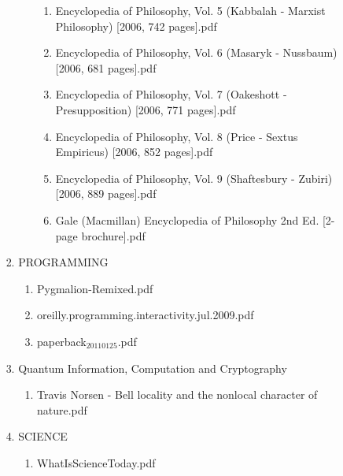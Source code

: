 \documentclass[11pt]{article}
\begin{document}
\begin{enumerate}
\begin{enumerate}
\begin{enumerate}
\begin{enumerate}
\begin{enumerate}
\begin{enumerate}
\item Encyclopedia of Philosophy, Vol. 5 (Kabbalah - Marxist Philosophy) [2006, 742 pages].pdf
\label{sec-1-1-1-1-7-3-39-16-7}

\item Encyclopedia of Philosophy, Vol. 6 (Masaryk - Nussbaum) [2006, 681 pages].pdf
\label{sec-1-1-1-1-7-3-39-16-8}

\item Encyclopedia of Philosophy, Vol. 7 (Oakeshott - Presupposition) [2006, 771 pages].pdf
\label{sec-1-1-1-1-7-3-39-16-9}

\item Encyclopedia of Philosophy, Vol. 8 (Price - Sextus Empiricus) [2006, 852 pages].pdf
\label{sec-1-1-1-1-7-3-39-16-10}

\item Encyclopedia of Philosophy, Vol. 9 (Shaftesbury - Zubiri) [2006, 889 pages].pdf
\label{sec-1-1-1-1-7-3-39-16-11}

\item Gale (Macmillan) Encyclopedia of Philosophy 2nd Ed. [2-page brochure].pdf
\label{sec-1-1-1-1-7-3-39-16-12}
\end{enumerate}
\end{enumerate}

\item PROGRAMMING
\label{sec-1-1-1-1-7-3-40}
\begin{enumerate}
\item Pygmalion-Remixed.pdf
\label{sec-1-1-1-1-7-3-40-1}

\item oreilly.programming.interactivity.jul.2009.pdf
\label{sec-1-1-1-1-7-3-40-2}

\item paperback$_{\text{20110125}}$.pdf
\label{sec-1-1-1-1-7-3-40-3}
\end{enumerate}

\item Quantum Information, Computation and Cryptography
\label{sec-1-1-1-1-7-3-41}
\begin{enumerate}
\item Travis Norsen - Bell locality and the nonlocal character of nature.pdf
\label{sec-1-1-1-1-7-3-41-1}
\end{enumerate}

\item SCIENCE
\label{sec-1-1-1-1-7-3-42}
\begin{enumerate}
\item WhatIsScienceToday.pdf
\label{sec-1-1-1-1-7-3-42-1}
\end{enumerate}


\end{enumerate}
\end{enumerate}
\end{enumerate}
\end{enumerate}
\end{document}
